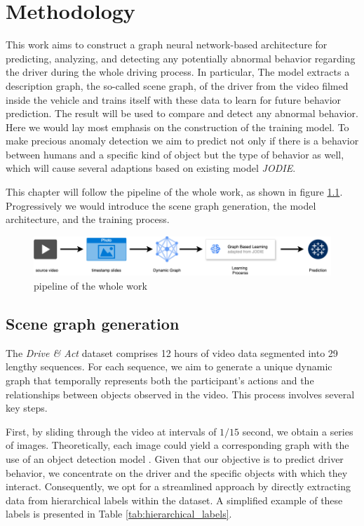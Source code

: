 \chapter{Methodology}\label{chapter:methodology}



This work aims to construct a graph neural network-based architecture for predicting, analyzing, and detecting any potentially abnormal behavior regarding the driver during the whole driving process. In particular, The model extracts a description graph, the so-called scene graph, of the driver from the video filmed inside the vehicle and trains itself with these data to learn for future behavior prediction. The result will be used to compare and detect any abnormal behavior. Here we would lay most emphasis on the construction of the training model. To make precious anomaly detection we aim to predict not only if there is a behavior between humans and a specific kind of object but the type of behavior as well, which will cause several adaptions based on existing model \textit{JODIE}. 

This chapter will follow the pipeline of the whole work, as shown in figure \ref{fig:pipeline}. Progressively we would introduce the scene graph generation, the model architecture, and the training process. 

\begin{figure}
    \centering
    \includegraphics[width=\linewidth]{figures/04_pipeline.png}
    \caption{pipeline of the whole work}
    \label{fig:pipeline}
\end{figure}


\section{Scene graph generation}

The \textit{Drive \& Act} dataset comprises 12 hours of video data segmented into 29 lengthy sequences. For each sequence, we aim to generate a unique dynamic graph that temporally represents both the participant's actions and the relationships between objects observed in the video. This process involves several key steps.


First, by sliding through the video at intervals of $1/15$ second, we obtain a series of images. Theoretically, each image could yield a corresponding graph with the use of an object detection model \cite{tang2020unbiased}. Given that our objective is to predict driver behavior, we concentrate on the driver and the specific objects with which they interact. Consequently, we opt for a streamlined approach by directly extracting data from hierarchical labels within the dataset. A simplified example of these labels is presented in Table \ref{tab:hierarchical_labels}.

